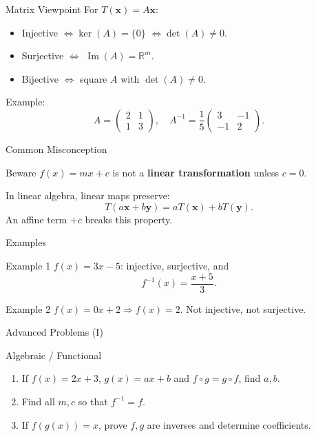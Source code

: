 \documentclass[aspectratio=169,10pt]{beamer}
\begin{document}
\begin{frame}{Matrix Viewpoint}
For \(T(\mathbf{x})=A\mathbf{x}\):

\begin{itemize}
    \item Injective $\Leftrightarrow \ker(A)=\{0\}$ $\Leftrightarrow \det(A)\neq0$.
    \item Surjective $\Leftrightarrow$ $\operatorname{Im}(A)=\mathbb{R}^m$.
    \item Bijective $\Leftrightarrow$ square $A$ with $\det(A)\neq0$.
\end{itemize}

\pause
Example:
\[
A=\begin{pmatrix}2 & 1\\ 1 & 3\end{pmatrix},\quad
A^{-1}=\frac{1}{5}\begin{pmatrix}3 & -1\\ -1 & 2\end{pmatrix}.
\]
\end{frame}

\begin{frame}{Common Misconception}
\begin{alertblock}{Beware}
\(f(x)=mx+c\) is not a \textbf{linear transformation} unless \(c=0\).
\end{alertblock}

\pause
In linear algebra, linear maps preserve:
\[
T(a\mathbf{x}+b\mathbf{y}) = aT(\mathbf{x}) + bT(\mathbf{y}).
\]
An affine term \(+c\) breaks this property.
\end{frame}

\begin{frame}{Examples}
\begin{exampleblock}{Example 1}
\(f(x)=3x-5\): injective, surjective, and
\[
f^{-1}(x)=\frac{x+5}{3}.
\]
\end{exampleblock}

\pause
\begin{exampleblock}{Example 2}
\(f(x)=0x+2\Rightarrow f(x)=2\).
Not injective, not surjective.
\end{exampleblock}
\end{frame}

\begin{frame}{Advanced Problems (I)}
\begin{alertblock}{Algebraic / Functional}
\begin{enumerate}
    \item If \(f(x)=2x+3\), \(g(x)=ax+b\) and \(f\circ g=g\circ f\), find \(a,b\).
    \item Find all \(m,c\) so that \(f^{-1}=f\).
    \item If \(f(g(x))=x\), prove \(f,g\) are inverses and determine coefficients.
\end{enumerate}
\end{alertblock}
\end{frame}
\end{document}

